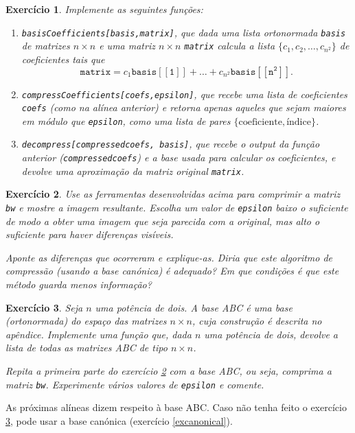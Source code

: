 \documentclass{article}
\newtheorem{ex}{Exercício}[section]
\begin{document}
\begin{ex}
Implemente as seguintes funções:
\begin{enumerate}
\item \texttt{basisCoefficients[basis,matrix]}, que dada uma lista \emph{ortonormada} \texttt{basis} de matrizes $n \times n$ e uma matriz $n \times n$ \texttt{matrix} calcula a lista $\{c_1, c_2, \dots, c_{n^2}\}$ de coeficientes tais que
\[\mathtt{matrix} = c_1 \mathtt{basis[[1]]} + \dots + c_{n^2} \mathtt{basis[[n^2]]}.\]
\item \texttt{compressCoefficients[coefs,epsilon]}, que recebe uma lista de coeficientes \texttt{coefs} (como na alínea anterior) e retorna apenas aqueles que sejam maiores em módulo que \texttt{epsilon}, como uma lista de pares $\{\text{coeficiente}, \text{índice}\}$.
\item \texttt{decompress[compressedcoefs, basis]}, que recebe o output da função anterior (\texttt{compressedcoefs}) e a base usada para calcular os coeficientes, e devolve uma aproximação da matriz original \texttt{matrix}.
\end{enumerate}
\end{ex}

\begin{ex}\label{excomprimir}
Use as ferramentas desenvolvidas acima para comprimir a matriz \texttt{bw} e mostre a imagem resultante. Escolha um valor de \texttt{epsilon} baixo o suficiente de modo a obter uma imagem que seja parecida com a original, mas alto o suficiente para haver diferenças visíveis.

Aponte as diferenças que ocorreram e explique-as. Diria que este algoritmo de compressão (usando a base canónica) é adequado? Em que condições é que este método guarda menos informação?
\end{ex}

\begin{ex}\label{exabc} Seja $n$ uma potência de dois. A \emph{base ABC} é uma base (ortonormada) do espaço das matrizes $n \times n$, cuja construção é descrita no apêndice. Implemente uma função que, dada $n$ uma potência de dois, devolve a lista de todas as matrizes ABC de tipo $n \times n$.

Repita a primeira parte do exercício \ref{excomprimir} com a base ABC, ou seja, comprima a matriz \texttt{bw}. Experimente vários valores de \texttt{epsilon} e comente.
\end{ex}

As próximas alíneas dizem respeito à base ABC. Caso não tenha feito o exercício \ref{exabc}, pode usar a base canónica (exercício \ref{excanonical}).
\end{document}
